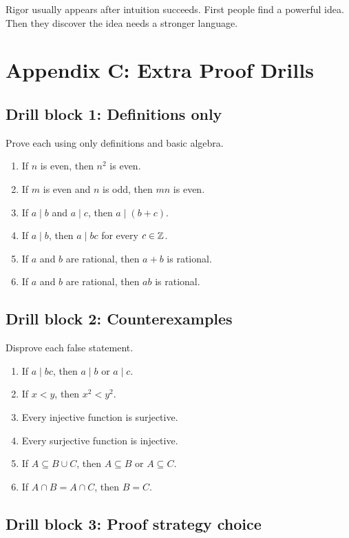 \documentclass[11pt]{article}
\begin{document}
\begin{focusbox}
Rigor usually appears after intuition succeeds. First people find a powerful idea. Then they discover the idea needs a stronger language.
\end{focusbox}

\newpage
\section{Appendix C: Extra Proof Drills}

\subsection{Drill block 1: Definitions only}

Prove each using only definitions and basic algebra.

\begin{enumerate}
\item If $n$ is even, then $n^2$ is even.
\item If $m$ is even and $n$ is odd, then $mn$ is even.
\item If $a\mid b$ and $a\mid c$, then $a\mid(b+c)$.
\item If $a\mid b$, then $a\mid bc$ for every $c\in\mathbb{Z}$.
\item If $a$ and $b$ are rational, then $a+b$ is rational.
\item If $a$ and $b$ are rational, then $ab$ is rational.
\end{enumerate}

\subsection{Drill block 2: Counterexamples}

Disprove each false statement.

\begin{enumerate}
\item If $a\mid bc$, then $a\mid b$ or $a\mid c$.
\item If $x<y$, then $x^2<y^2$.
\item Every injective function is surjective.
\item Every surjective function is injective.
\item If $A\subseteq B\cup C$, then $A\subseteq B$ or $A\subseteq C$.
\item If $A\cap B=A\cap C$, then $B=C$.
\end{enumerate}

\subsection{Drill block 3: Proof strategy choice}
\end{document}
